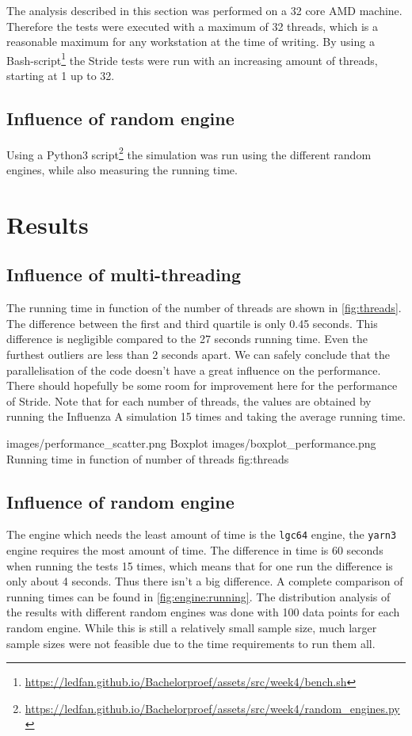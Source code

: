 \documentclass[natbib=true]{acmart}
\begin{document}
The analysis described in this section was performed on a 32 core AMD machine. Therefore the tests were executed with a maximum of 32 threads, which is a reasonable maximum for any workstation at the time of writing. By using a Bash-script\footnote{\url{https://ledfan.github.io/Bachelorproef/assets/src/week4/bench.sh}}
the Stride tests were run with an increasing amount of threads, starting at 1 up to 32.

\subsection{Influence of random engine}

Using a Python3 script\footnote{\url{https://ledfan.github.io/Bachelorproef/assets/src/week4/random\_engines.py}} 
the simulation was run using the different random engines, while also measuring the running time.

\section{Results}

\subsection{Influence of multi-threading}
The running time in function of the number of threads are shown in \cref{fig:threads}. The difference between the first and third
quartile is only 0.45 seconds. This difference is negligible compared to the 27 seconds running time. Even the furthest outliers are less than 2 seconds apart. We can safely conclude
that the parallelisation of the code doesn’t have a great influence on the performance. There should hopefully be some room for improvement here for the performance of Stride.
Note that for each number of threads, the values are obtained by running the Influenza A simulation 15 times and taking the average running time.

    {images/performance_scatter.png}
    {Boxplot}
    {images/boxplot_performance.png}
    {Running time in function of number of threads}
    {fig:threads}
\subsection{Influence of random engine}
The engine which needs the least amount of time is the \texttt{lgc64} engine, the \texttt{yarn3} engine requires the most amount of time. The difference in time is 60 seconds when running the tests 15 times, which means that for one run the difference is only about 4 seconds. Thus there isn’t a big difference. A complete comparison of running times can be found in \cref{fig:engine:running}.
The distribution analysis of the results with different random engines was done with 100 data points for each random engine. While this is still a relatively small sample size, much larger sample sizes were not feasible due to the time requirements to run them all.
\end{document}
